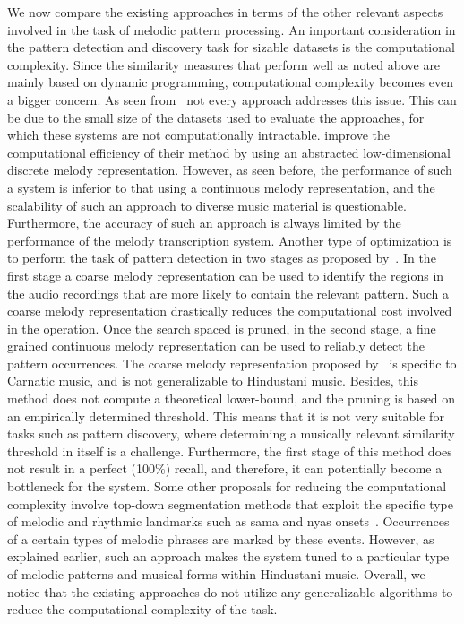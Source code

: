 We now compare the existing approaches in terms of the other relevant aspects involved in the task of melodic pattern processing. An important consideration in the pattern detection and discovery task for sizable datasets is the computational complexity. Since the similarity measures that perform well as noted above are mainly based on dynamic programming, computational complexity becomes even a bigger concern. As seen from~ not every approach addresses this issue. This can be due to the small size of the datasets used to evaluate the approaches, for which these systems are not computationally intractable. \cite{ganguli2015efficient} improve the computational efficiency of their method by using an abstracted low-dimensional discrete melody representation. However, as seen before, the performance of such a system is inferior to that using a continuous melody representation, and the scalability of such an approach to diverse music material is questionable. Furthermore, the accuracy of such an approach is always limited by the performance of the melody transcription system. Another type of optimization is to perform the task of pattern detection in two stages as proposed by~\cite{dutta2014modified,Ishwar2013}. In the first stage a coarse melody representation can be used to identify the regions in the audio recordings that are more likely to contain the relevant pattern. Such a coarse melody representation drastically reduces the computational cost involved in the operation. Once the search spaced is pruned, in the second stage, a fine grained continuous melody representation can be used to reliably detect the pattern occurrences. The coarse melody representation proposed by~\cite{Ishwar2013} is specific to Carnatic music, and is not generalizable to Hindustani music. Besides, this method does not compute a theoretical lower-bound, and the pruning is based on an empirically determined threshold. This means that it is not very suitable for tasks such as pattern discovery, where determining a musically relevant similarity threshold in itself is a challenge. Furthermore, the first stage of this method does not result in a perfect (100\%) recall, and therefore, it can potentially become a bottleneck for the system. Some other proposals for reducing the computational complexity involve top-down segmentation methods that exploit the specific type of melodic and rhythmic landmarks such as \gls{sama} and \gls{nyas} onsets~\citep{Ross2012,Ross2012b}. Occurrences of a certain types of melodic phrases are marked by these events. However, as explained earlier, such an approach makes the system tuned to a particular type of melodic patterns and musical forms within Hindustani music. Overall, we notice that the existing approaches do not utilize any generalizable algorithms to reduce the computational complexity of the task. 

